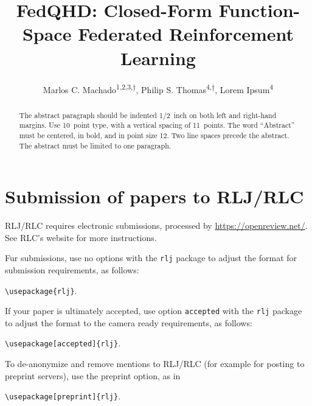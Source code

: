 \documentclass[10pt]{article} %
\title{FedQHD: Closed-Form Function-Space Federated Reinforcement Learning}
\author{Marlos C. Machado\textsuperscript{1,2,3,$\dagger$}, Philip S. Thomas\textsuperscript{4,$\dagger$}, Lorem Ipsum\textsuperscript{4}}
\theoremstyle{plain}
\theoremstyle{definition}
\theoremstyle{remark}
\begin{document}
\makeCover  %
\maketitle  %

\begin{abstract}
The abstract paragraph should be indented 1/2~inch on both left and right-hand margins. Use 10~point type, with a vertical spacing of 11~points. The word ``Abstract'' must be centered, in bold, and in point size 12. Two line spaces precede the abstract. The abstract must be limited to one paragraph.
\end{abstract}


















\section{Submission of papers to RLJ/RLC}
\label{sec:submission}

RLJ/RLC requires electronic submissions, processed by \url{https://openreview.net/}. See RLC's website for more instructions.

Fur submissions, use no options with the {\tt rlj} package to adjust the format for submission requirements, as follows:
\begin{center}  
    {\tt {\textbackslash}usepackage\{rlj\}}. 
\end{center}
If your paper is ultimately accepted, use option {\tt accepted} with the {\tt rlj} package to adjust the format to the camera ready requirements, as follows:
\begin{center}  
    {\tt {\textbackslash}usepackage[accepted]\{rlj\}}. 
\end{center}
To de-anonymize and remove mentions to RLJ/RLC (for example for posting to preprint servers), use the preprint option, as in 
\begin{center}
    {\tt {\textbackslash}usepackage[preprint]\{rlj\}}. 
\end{center}
\end{document}
